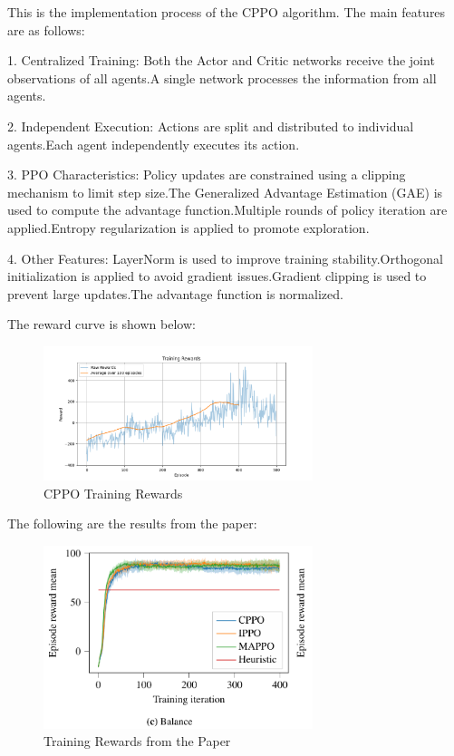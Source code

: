 \documentclass[12pt]{article}
\begin{document}
This is the implementation process of the CPPO algorithm. The main features are as follows:

1. Centralized Training: Both the Actor and Critic networks receive the joint observations of all agents.A single network processes the information from all agents.

2. Independent Execution: Actions are split and distributed to individual agents.Each agent independently executes its action.

3. PPO Characteristics: Policy updates are constrained using a clipping mechanism to limit step size.The Generalized Advantage Estimation (GAE) is used to compute the advantage function.Multiple rounds of policy iteration are applied.Entropy regularization is applied to promote exploration.

4. Other Features: LayerNorm is used to improve training stability.Orthogonal initialization is applied to avoid gradient issues.Gradient clipping is used to prevent large updates.The advantage function is normalized.

The reward curve is shown below:

\begin{figure}[h]
    \centering
    \includegraphics[width=0.7\textwidth]{cppo_training_rewards.png}
    \caption{CPPO Training Rewards}
    \label{fig:cppo_rewards}
\end{figure}

The following are the results from the paper:

\begin{figure}[h]
    \centering
    \includegraphics[width=0.7\textwidth]{training_rewards.png}
    \caption{Training Rewards from the Paper}
    \label{fig:paper_rewards}
\end{figure}
\end{document}
